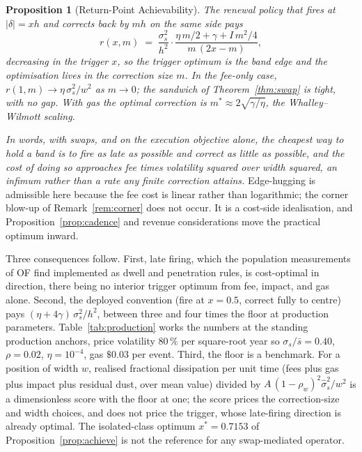 \documentclass[11pt,a4paper]{article}
\theoremstyle{definition}
\theoremstyle{plain}
\newtheorem{proposition}{Proposition}
\theoremstyle{remark}
\begin{document}
\begin{proposition}[Return-Point Achievability]\label{prop:return}
The renewal policy that fires at $|\delta| = x h$ and corrects back by $m h$ on the same side pays
\begin{equation}\label{eq:rswap}
r(x, m) \;=\; \frac{\sigma_s^2}{h^2} \cdot
\frac{\eta\,m/2 + \gamma + I\,m^2/4}{m\,(2x - m)},
\end{equation}
decreasing in the trigger $x$, so the trigger optimum is the band edge and the optimisation lives in the correction size $m$. In the fee-only case, $r(1, m) \to \eta\,\sigma_s^2/w^2$ as $m \to 0$; 
the sandwich of Theorem~\ref{thm:swap} is tight, with no gap. With gas the optimal correction is $m^* \approx 2\sqrt{\gamma/\eta}$, the Whalley--Wilmott scaling.
\end{proposition}

\emph{In words, with swaps, and on the execution objective alone, the cheapest way to hold a band is to fire as late as possible and correct as little as possible, and the cost of doing so 
approaches fee times volatility squared over width squared, an infimum rather than a rate any finite correction attains.} Edge-hugging is admissible here because the fee cost is linear rather 
than logarithmic; the corner blow-up of Remark~\ref{rem:corner} does not occur. It is a cost-side idealisation, and Proposition~\ref{prop:cadence} and revenue considerations move the practical 
optimum inward.

Three consequences follow. First, late firing, which the population measurements of OF find implemented as dwell and penetration rules, is cost-optimal in direction, there being no interior 
trigger optimum from fee, impact, and gas alone. Second, the deployed convention (fire at $x = 0.5$, correct fully to centre) pays $(\eta +
4\gamma)\,\sigma_s^2/h^2$, between three and four 
times the floor at production parameters. Table~\ref{tab:production} works the numbers at the standing production anchors, price volatility $80\,\%$ per square-root year so $\sigma_s/\bar s = 0.40$, 
$\rho = 0.02$, $\eta = 10^{-4}$, gas $\$0.03$ per event. Third, the floor is a benchmark. For a position of width $w$, realised fractional dissipation per unit time (fees plus gas plus impact 
plus residual dust, over mean value) divided by $A\,(1-\rho_w)^2
\hat\sigma_s^2/w^2$ is a dimensionless score with the floor at one; the score prices the correction-size and width choices, and does 
not price the trigger, whose late-firing direction is already optimal. The isolated-class optimum $x^* = 0.7153$ of Proposition~\ref{prop:achieve} is not the reference for any swap-mediated operator.
\end{document}
